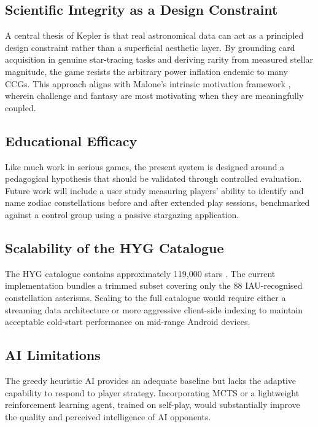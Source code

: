 \documentclass[conference]{IEEEtran}
\begin{document}
\subsection{Scientific Integrity as a Design Constraint}
A central thesis of Kepler is that real astronomical data can act as a principled design constraint rather than a superficial aesthetic layer. By grounding card acquisition in genuine star-tracing tasks and deriving rarity from measured stellar magnitude, the game resists the arbitrary power inflation endemic to many CCGs. This approach aligns with Malone's intrinsic motivation framework \cite{malone1981toward}, wherein challenge and fantasy are most motivating when they are meaningfully coupled.

\subsection{Educational Efficacy}
Like much work in serious games, the present system is designed around a pedagogical hypothesis that should be validated through controlled evaluation. Future work will include a user study measuring players' ability to identify and name zodiac constellations before and after extended play sessions, benchmarked against a control group using a passive stargazing application.

\subsection{Scalability of the HYG Catalogue}
The HYG catalogue contains approximately 119,000 stars \cite{hyg}. The current implementation bundles a trimmed subset covering only the 88 IAU-recognised constellation asterisms. Scaling to the full catalogue would require either a streaming data architecture or more aggressive client-side indexing to maintain acceptable cold-start performance on mid-range Android devices.

\subsection{AI Limitations}
The greedy heuristic AI provides an adequate baseline but lacks the adaptive capability to respond to player strategy. Incorporating MCTS \cite{cowling2012information} or a lightweight reinforcement learning agent, trained on self-play, would substantially improve the quality and perceived intelligence of AI opponents.

\end{document}

